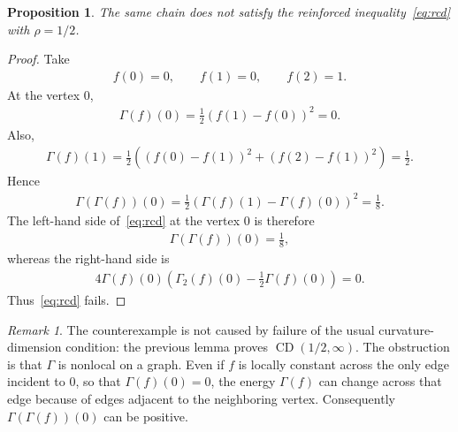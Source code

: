 \documentclass[11pt]{article}
\theoremstyle{plain}
\newtheorem{proposition}[theorem]{Proposition}
\theoremstyle{definition}
\theoremstyle{remark}
\newtheorem{remark}[theorem]{Remark}
\begin{document}
\begin{proposition}
The same chain does not satisfy the reinforced inequality~\eqref{eq:rcd} with $\rho=1/2$.
\end{proposition}

\begin{proof}
Take
\begin{align*}
    f(0)=0,\qquad f(1)=0,\qquad f(2)=1.
\end{align*}
At the vertex $0$,
\begin{align*}
    \Gamma(f)(0)
    =
    \frac{1}{2}\left(f(1)-f(0)\right)^2
    =
    0.
\end{align*}
Also,
\begin{align*}
    \Gamma(f)(1)
    =
    \frac{1}{2}\left((f(0)-f(1))^2+(f(2)-f(1))^2\right)
    =
    \frac{1}{2}.
\end{align*}
Hence
\begin{align*}
    \Gamma(\Gamma(f))(0)
    =
    \frac{1}{2}\left(\Gamma(f)(1)-\Gamma(f)(0)\right)^2
    =
    \frac{1}{8}.
\end{align*}
The left-hand side of~\eqref{eq:rcd} at the vertex $0$ is therefore
\begin{align*}
    \Gamma(\Gamma(f))(0)=\frac18,
\end{align*}
whereas the right-hand side is
\begin{align*}
    4\Gamma(f)(0)\left(\Gamma_2(f)(0)-\frac12\Gamma(f)(0)\right)=0.
\end{align*}
Thus~\eqref{eq:rcd} fails.
\end{proof}

\begin{remark}
The counterexample is not caused by failure of the usual curvature-dimension condition: the previous lemma proves $\operatorname{CD}(1/2,\infty)$. The obstruction is that $\Gamma$ is nonlocal on a graph. Even if $f$ is locally constant across the only edge incident to $0$, so that $\Gamma(f)(0)=0$, the energy $\Gamma(f)$ can change across that edge because of edges adjacent to the neighboring vertex. Consequently $\Gamma(\Gamma(f))(0)$ can be positive.
\end{remark}
\end{document}
